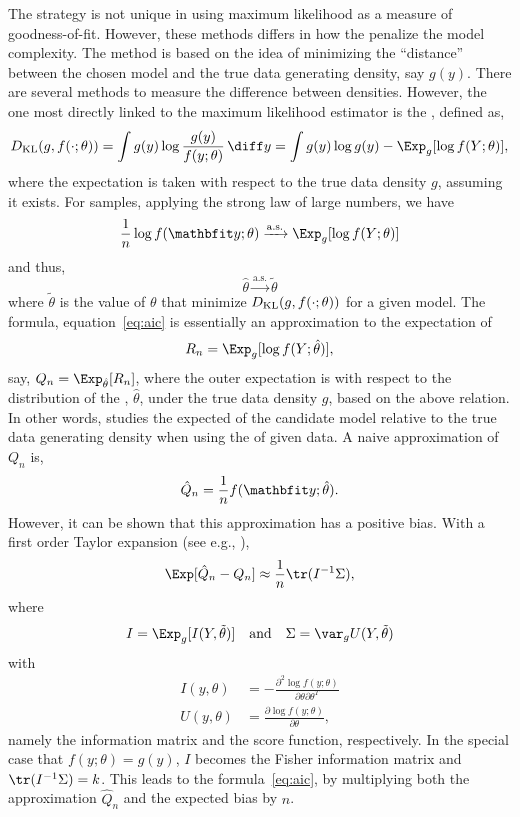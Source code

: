 The \aic strategy is not unique in using maximum likelihood as a measure of
goodness-of-fit. However, these methods differs in how the penalize the model
complexity. The \aic method is based on the idea of minimizing the
``distance'' between the chosen model and the true data generating density,
say $g(y)$. There are several methods to measure the difference between
densities. However, the one most directly linked to the maximum likelihood
estimator is the \kl, defined as,
\begin{equation}
  \dkl(g, f(\cdot;\theta))
  = \int g(y)\log\frac{g(y)}{f(y;\theta)}\intd y
  = \int g(y)\log g(y) - \Exp_g[\log f(Y;\theta)],
\end{equation}
where the expectation is taken with respect to the true data density $g$,
assuming it exists. For \iid samples, applying the strong law of large
numbers, we have
\begin{equation}
  \frac{1}{n}\log f(\data;\theta) \xrightarrow{\text{a.s.}}
  \Exp_g[\log f(Y;\theta)]
\end{equation}
and thus,
\begin{equation}
  \hat\theta \xrightarrow{\text{a.s.}} \tilde\theta
\end{equation}
where $\tilde\theta$ is the value of $\theta$ that minimize
$D_{\mathrm{KL}}(g,f(\cdot;\theta))$ for a given model. The \aic formula,
equation~\eqref{eq:aic} is essentially an approximation to the expectation of
\begin{equation}
  R_n = \Exp_g[\log f(Y;\hat\theta)],
\end{equation}
say, $Q_n = \Exp_{\hat\theta}[R_n]$, where the outer expectation is with
respect to the distribution of the \mle, $\hat\theta$, under the true data
density $g$, based on the above relation. In other words, \aic studies the
expected \kl of the candidate model relative to the true data generating
density when using the \mle of given data. A naive approximation of $Q_n$ is,
\begin{equation}
  \hat{Q}_n = \frac{1}{n} f(\data;\hat\theta).
\end{equation}
However, it can be shown that this approximation has a positive bias. With a
first order Taylor expansion (see e.g., \cite[][sec.~2.3]{Claeskens:2008tq}),
\begin{equation}
  \Exp[\hat{Q}_n - Q_n] \approx \frac{1}{n}\tr(I^{-1}\Sigma),
  \label{eq:aic Taylor}
\end{equation}
where
\begin{equation}
  I = \Exp_g[I(Y,\tilde\theta)]\quad\text{and}\quad
  \Sigma = \var_g U(Y,\tilde\theta)
\end{equation}
with
\begin{align}
  I(y,\theta) &=
  -\frac{\partial^2\log f(y;\theta)}{\partial\theta\partial\theta^T}\\
  U(y,\theta) &=
  \frac{\partial\log f(y;\theta)}{\partial\theta},
\end{align}
namely the information matrix and the score function, respectively. In the
special case that $f(y;\theta) = g(y)$, $I$ becomes the Fisher information
matrix and $\tr(I^{-1}\Sigma) = k$. This leads to the \aic
formula~\eqref{eq:aic}, by multiplying both the approximation $\hat{Q}_n$ and
the expected bias by $n$.

